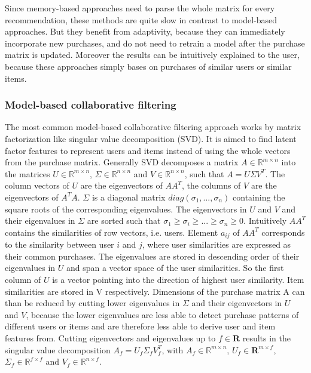 \documentclass[10pt]{reportMaster}
\begin{document}
Since memory-based approaches need to parse the whole matrix for every recommendation, these methods are quite slow in contrast to model-based approaches.
But they benefit from adaptivity, because they can immediately incorporate new purchases, and do not need to retrain a model after the purchase matrix is updated.
Moreover the results can be intuitively explained to the user, because these approaches simply bases on purchases of similar users or similar items.

\subsubsection{Model-based collaborative filtering}
The most common model-based collaborative filtering approach works by matrix factorization like singular value decomposition (SVD).
It is aimed to find latent factor features to represent users and items instead of using the whole vectors from the purchase matrix.
Generally SVD decomposes a matrix $A \in \mathds{R}^{m \times n}$ into the matrices $U \in \mathds{R}^{m \times n}$, $\Sigma \in \mathds{R}^{n \times n}$ and $V \in \mathds{R}^{n \times n}$, such that $A = U \Sigma V^T$.
The column vectors of $U$ are the eigenvectors of $AA^T$, the columns of $V$ are the eigenvectors of $A^TA$.
$\Sigma$ is a diagonal matrix $diag(\sigma_1, ..., \sigma_n)$ containing the square roots of the corresponding eigenvalues.  %
The eigenvectors in $U$ and $V$ and their eigenvalues in $\Sigma$ are sorted such that $\sigma_1 \geq \sigma_i \geq ... \geq \sigma_n \geq 0$.
Intuitively $AA^T$ contains the similarities of row vectors, i.e. users.
Element $a_{ij}$ of $AA^T$ corresponds to the similarity between user $i$ and $j$, where user similarities are expressed as their common purchases.
The eigenvalues are stored in descending order of their eigenvalues in $U$ and span a vector space of the user similarities.
So the first column of $U$ is a vector pointing into the direction of highest user similarity. %
Item similarities are stored in V respectively.
Dimensions of the purchase matrix A can than be reduced by cutting lower eigenvalues in $\Sigma$ and their eigenvectors in $U$ and $V$, because the lower eigenvalues are less able to detect purchase patterns of different users or items and are therefore less able to derive user and item features from.
Cutting eigenvectors and eigenvalues up to $f \in \mathbf{R}$ results in the singular value decomposition $A_f = U_f \Sigma_f V_f^T$, with $A_f \in \mathds{R}^{m \times n}$, $U_f \in \mathbf{R}^{m \times f}$, $\Sigma_f \in \mathds{R}^{f \times f}$ and $V_f \in \mathds{R}^{n \times f}$.
\end{document}
